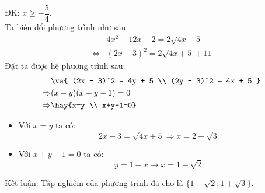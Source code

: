 \hda
ĐK: $x \ge - \dfrac{5}{4}$.\\
Ta biến đổi phương trình như sau: 
\begin{align*}
& 4x^2 - 12x - 2 = 2\sqrt {4x + 5} \\ \Leftrightarrow & (2x - 3)^2 = 2\sqrt {4x + 5} + 11
\end{align*}
Đặt ta được hệ phương trình sau:
\begin{align*}
& \va{ (2x - 3)^2 = 4y + 5 \\ 
 (2y - 3)^2 = 4x + 5 } \\
 \Rightarrow & (x - y)(x + y - 1) = 0 \\
 \Rightarrow & \hay{x=y \\ x+y-1=0}
\end{align*}
\begin{itemize}
\item Với $x = y$ ta có:
$$2x - 3 = \sqrt {4x + 5} \Rightarrow x = 2 + \sqrt 3 $$
\item Với $x + y - 1 = 0$ ta có:
$$y = 1 - x \to x = 1 - \sqrt 2 $$
\end{itemize} 
Kết luận: Tập nghiệm của phương trình đã cho là $\{ 1 - \sqrt 2 ; 1 + \sqrt 3 \} $.
